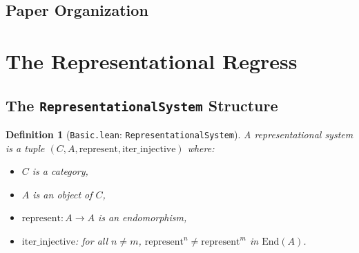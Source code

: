 \documentclass[11pt]{article}
\newtheorem{definition}[theorem]{Definition}
\newcommand{\leanref}[1]{\texttt{\small #1}}
\begin{document}
\subsection{Paper Organization}

\section{The Representational Regress}
\label{sec:regress}


\subsection{The \texttt{RepresentationalSystem} Structure}
\label{sec:repsys}

\begin{definition}[\leanref{Basic.lean}: \leanref{RepresentationalSystem}]
A \emph{representational system} is a tuple $(C, A, \mathrm{represent}, \mathrm{iter\_injective})$ where:
\begin{itemize}
\item $C$ is a category,
\item $A$ is an object of $C$,
\item $\mathrm{represent} : A \to A$ is an endomorphism,
\item $\mathrm{iter\_injective}$: for all $n \neq m$, $\mathrm{represent}^n \neq \mathrm{represent}^m$ in $\mathrm{End}(A)$.
\end{itemize}
\end{definition}

%
\end{document}
